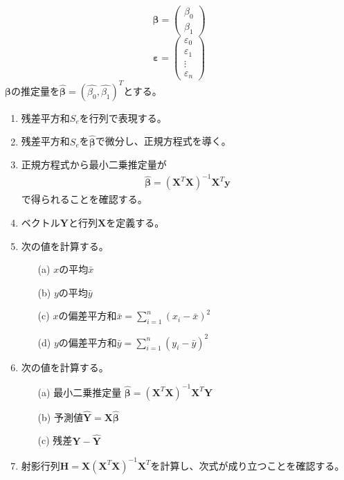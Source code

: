 \documentclass[12pt]{jarticle}
\begin{document}
\[
    \bm \beta = \left(
    \begin{array}{c}
            \beta_0 \\
            \beta_1
        \end{array}
    \right)
\]
\[
    \bm \varepsilon = \left(
    \begin{array}{c}
            \varepsilon_0 \\
            \varepsilon_1 \\
            \vdots        \\
            \varepsilon_n
        \end{array}
    \right)
\]
$\bm \beta$の推定量を$\hat{\bm \beta}=(\hat{\beta_0},\hat{\beta_1})^T$とする。
\begin{enumerate}
    \item 残差平方和$S_e$を行列で表現する。
    \item 残差平方和$S_e$を$\hat{\bm \beta}$で微分し、正規方程式を導く。
    \item 正規方程式から最小二乗推定量が
          \begin{eqnarray}
              \hat{\bm \beta}=(\bm X^T \bm X)^{-1} \bm X^T \bm y
          \end{eqnarray}
          で得られることを確認する。
    \item ベクトル$\bm Y$と行列$\bm X$を定義する。
          \clearpage
    \item 次の値を計算する。
          \begin{itemize}
              \item [(a)]$x$の平均$\bar{x}$
              \item [(b)]$y$の平均$\bar{y}$
              \item [(c)]$x$の偏差平方和$\bar{x}=\sum_{i=1}^{n} (x_i-\bar{x})^2$
              \item [(d)]$y$の偏差平方和$\bar{y}=\sum_{i=1}^{n} (y_i-\bar{y})^2$
          \end{itemize}
    \item 次の値を計算する。
          \begin{itemize}
              \item [(a)]最小二乗推定量 $\hat{\bm \beta}=(\bm X^T \bm X)^{-1} \bm X^T \bm Y$
              \item [(b)]予測値$\hat{\bm Y}=\bm X \hat{\bm \beta}$
              \item [(c)]残差$\bm Y-\hat{\bm Y}$
          \end{itemize}
    \item 射影行列$\bm H = \bm X (\bm X^T \bm X)^{-1}\bm X^T$を計算し、次式が成り立つことを確認する。

\end{enumerate}
\end{document}
